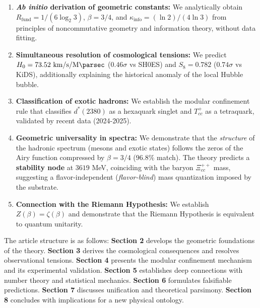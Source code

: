 \documentclass[11pt, a4paper]{article}
\theoremstyle{plain}
\theoremstyle{definition}
\newcommand{\Rfactor}{R_{\text{fund}}}
\newcommand{\Kinfo}{\kappa_{\text{info}}}
\begin{document}
\begin{enumerate}
    \item \textbf{\textit{Ab initio} derivation of geometric constants:} We analytically obtain $\Rfactor = 1/(6\log_2 3)$, $\beta = 3/4$, and $\Kinfo = (\ln 2)/(4\ln 3)$ from principles of noncommutative geometry and information theory, without data fitting.
    
    \item \textbf{Simultaneous resolution of cosmological tensions:} We predict $H_0 = 73.52\ \si{\kilo\meter\per\second\per\mega\parsec}$ ($0.46\sigma$ vs SH0ES) and $S_8 = 0.782$ ($0.74\sigma$ vs KiDS), additionally explaining the historical anomaly of the local Hubble bubble.
    
    \item \textbf{Classification of exotic hadrons:} We establish the modular confinement rule that classifies $d^*(2380)$ as a hexaquark singlet and $T_{cc}^+$ as a tetraquark, validated by recent data (2024-2025).
    
    \item \textbf{Geometric universality in spectra:} We demonstrate that the \textit{structure} of the hadronic spectrum (mesons and exotic states) follows the zeros of the Airy function compressed by $\beta = 3/4$ ($96.8\%$ match). The theory predicts a \textbf{stability node} at $3619$ MeV, coinciding with the baryon $\Xi_{cc}^{++}$ mass, suggesting a flavor-independent (\textit{flavor-blind}) mass quantization imposed by the substrate.
    
    \item \textbf{Connection with the Riemann Hypothesis:} We establish $Z(\beta) = \zeta(\beta)$ and demonstrate that the Riemann Hypothesis is equivalent to quantum unitarity.
\end{enumerate}

The article structure is as follows: \textbf{Section 2} develops the geometric foundations of the theory. \textbf{Section 3} derives the cosmological consequences and resolves observational tensions. \textbf{Section 4} presents the modular confinement mechanism and its experimental validation. \textbf{Section 5} establishes deep connections with number theory and statistical mechanics. \textbf{Section 6} formulates falsifiable predictions. \textbf{Section 7} discusses unification and theoretical parsimony. \textbf{Section 8} concludes with implications for a new physical ontology.

\end{document}
